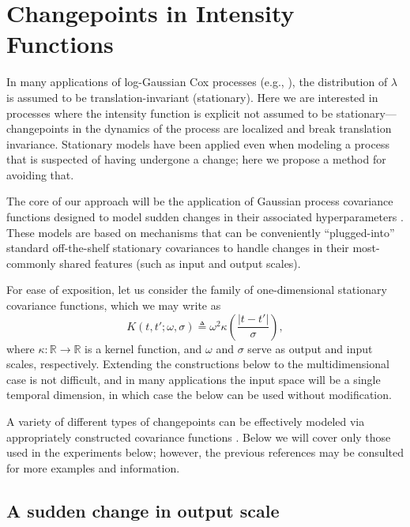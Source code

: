 \documentclass{article}
\newcommand{\deq}{\triangleq}
\newcommand{\R}{\mathbb{R}}
\begin{document}
\section{Changepoints in Intensity Functions}
\label{changepoints}

In many applications of log-Gaussian Cox processes (e.g.,
\citep{moller, adams}), the distribution of $\lambda$ is assumed to be
translation-invariant (stationary).  Here we are interested in
processes where the intensity function is explicit not assumed to be
stationary---changepoints in the dynamics of the process are localized
and break translation invariance.  Stationary models have been applied
\citep{adams} even when modeling a process that is suspected of having
undergone a change; here we propose a method for avoiding that.

The core of our approach will be the application of Gaussian process
covariance functions designed to model sudden changes in their
associated hyperparameters \citep{cpcj}.  These models are based on
mechanisms that can be conveniently ``plugged-into'' standard
off-the-shelf stationary covariances to handle changes in their
most-commonly shared features (such as input and output scales).

For ease of exposition, let us consider the family of one-dimensional
stationary covariance functions, which we may write as
\begin{equation*}
  K(t, t'; \omega, \sigma)
  \deq
  \omega^2
  \kappa\left( \frac{\lvert t - t' \rvert}{\sigma} \right),
\end{equation*}
where $\kappa\colon \R \to \R$ is a kernel function, and $\omega$ and
$\sigma$ serve as output and input scales, respectively.  Extending
the constructions below to the multidimensional case is not difficult,
and in many applications the input space will be a single temporal
dimension, in which case the below can be used without modification.

A variety of different types of changepoints can be effectively
modeled via appropriately constructed covariance functions
\citep{cpcj, thesis}.  Below we will cover only those used in the
experiments below; however, the previous references may be consulted
for more examples and information.

\subsection{A sudden change in output scale}
\end{document}
